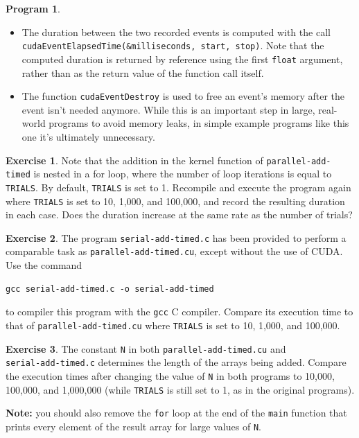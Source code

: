 \documentclass{article}
\theoremstyle{definition}
\newtheorem{program}{Program}
\newtheorem{exercise}{Exercise}
\begin{document}
\begin{program}
\begin{itemize}
    \item
    The duration between the two recorded events is computed with the call \texttt{cudaEventElapsedTime(\&milliseconds, start, stop)}. Note that the computed duration is returned by reference using the first \texttt{float} argument, rather than as the return value of the function call itself.
    
    \item
    The function \texttt{cudaEventDestroy} is used to free an event's memory after the event isn't needed anymore. While this is an important step in large, real-world programs to avoid memory leaks, in simple example programs like this one it's ultimately unnecessary.
\end{itemize}
\end{program}

\begin{exercise}
\label{ex-timed-1}
Note that the addition in the kernel function of \texttt{parallel-add-timed} is nested in a for loop, where the number of loop iterations is equal to \texttt{TRIALS}. By default, \texttt{TRIALS} is set to 1. Recompile and execute the program again where \texttt{TRIALS} is set to 10, 1,000, and 100,000, and record the resulting duration in each case. Does the duration increase at the same rate as the number of trials?
\end{exercise}

\begin{exercise}
The program \texttt{serial-add-timed.c} has been provided to perform a comparable task as \texttt{parallel-add-timed.cu}, except without the use of CUDA. Use the command
\begin{verbatim}gcc serial-add-timed.c -o serial-add-timed\end{verbatim} 
to compiler this program with the \texttt{gcc} C compiler. Compare its execution time to that of \texttt{parallel-add-timed.cu} where \texttt{TRIALS} is set to 10, 1,000, and 100,000.
\end{exercise}

\begin{exercise}
The constant \texttt{N} in both \texttt{parallel-add-timed.cu} and \\
\texttt{serial-add-timed.c} determines the length of the arrays being added. Compare the execution times after changing the value of \texttt{N} in both programs to 10,000, 100,000, and 1,000,000 (while \texttt{TRIALS} is still set to 1, as in the original programs).

\textbf{Note:} you should also remove the \texttt{for} loop at the end of the \texttt{main} function that prints every element of the result array for large values of \texttt{N}.
\end{exercise}
\end{document}
